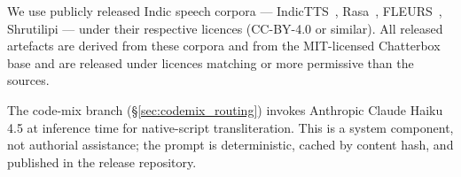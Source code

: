\documentclass[conference,a4paper]{IEEEtran}
\begin{document}
We use publicly released Indic speech corpora --- IndicTTS~\cite{indictts2022}, Rasa~\cite{ai4bharat2023rasa}, FLEURS~\cite{conneau2022fleurs}, Shrutilipi --- under their respective licences (CC-BY-4.0 or similar). All released artefacts are derived from these corpora and from the MIT-licensed Chatterbox base and are released under licences matching or more permissive than the sources.

The code-mix branch (§\ref{sec:codemix_routing}) invokes Anthropic Claude Haiku 4.5 at inference time for native-script transliteration. This is a system component, not authorial assistance; the prompt is deterministic, cached by content hash, and published in the release repository.



\end{document}
